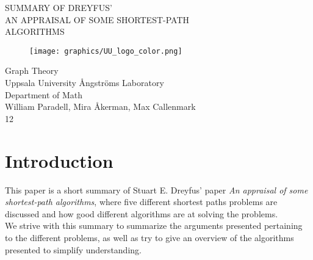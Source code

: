 \documentclass{article}
\begin{document}
\thispagestyle{empty}

\vspace*{+2em}
\begin{center}
    {\LARGE SUMMARY OF DREYFUS' \\
    AN APPRAISAL OF SOME SHORTEST-PATH \\
    ALGORITHMS\\}
\vspace*{+4em}


\vspace*{+3em}
\begin{figure}[h]
    \centering
    \texttt{[image: graphics/UU\_logo\_color.png]}
\end{figure}

\vspace*{+3em}
Graph Theory \\
Uppsala University Ångströms Laboratory\\
Department of Math\\
\vspace*{+2em}
William Paradell, Mira Åkerman, Max Callenmark\\

\vspace*{+10em}
12

\end{center}

\newpage

\section*{Introduction}

This paper is a short summary of Stuart E. Dreyfus' paper 
\textit{An appraisal of some shortest-path algorithms}\cite{Dreyfus_1969}, where five 
different shortest paths problems are discussed and how good 
different algorithms are at solving the problems.  \\
\indent We strive with this summary to summarize the arguments presented
pertaining to the different problems, as well as try to give an 
overview of the algorithms presented to simplify understanding. 
\end{document}
